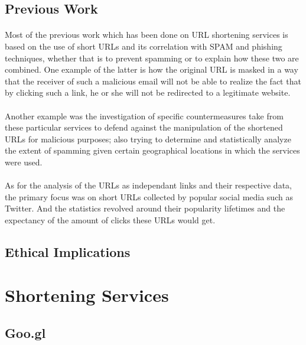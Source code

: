 \documentclass[12pt]{article}
\begin{document}
\subsection{Previous Work}

\paragraph{}
Most of the previous work which has been done on URL shortening services is based on the use of short URLs and its correlation with SPAM and phishing techniques, whether that is to prevent spamming or to explain how these two are combined. One example of the latter is how the original URL is masked in a way that the receiver of such a malicious email will not be able to realize the fact that by clicking such a link, he or she will not be redirected to a legitimate website.
 
\paragraph{}
Another example was the investigation of specific countermeasures take from these particular services to defend against the manipulation of the shortened URLs for malicious purposes; also trying to determine and statistically analyze the extent of spamming given certain geographical locations in which the services were used.

\paragraph{}
As for the analysis of the URLs as independant links and their respective data, the primary focus was on short URLs collected by popular social media such as Twitter. And the statistics revolved around their popularity lifetimes and the expectancy of the amount of clicks these URLs would get.

\subsection{Ethical Implications}

\section{Shortening Services}

\subsection{Goo.gl}
\end{document}
